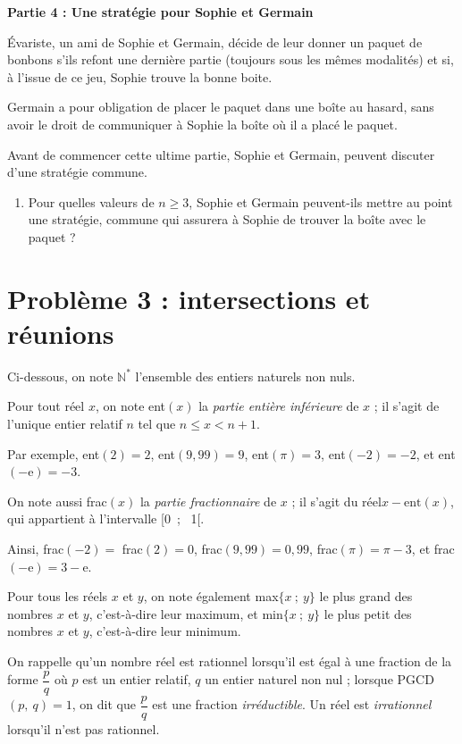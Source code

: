 \documentclass[landscape,twocolumn,leqno,a4paper,10pt]{report} %
\newcommand{\e}{\mathrm{e}}
\renewcommand{\textbf}[1]{\begingroup\bfseries\mathversion{bold}#1\endgroup}		%
\newcommand\N{\mathbb{N}}
\begin{document}
\bigskip
\begin{center}

\textbf{Partie 4 : Une stratégie pour Sophie et Germain}\end{center}

Évariste, un ami de Sophie et Germain, décide de leur donner un paquet de bonbons s'ils refont une dernière partie (toujours sous les mêmes modalités) et si, à l'issue de ce jeu, Sophie trouve la bonne boite.

Germain a pour obligation de placer le paquet dans une boîte au hasard, sans avoir le droit de communiquer à Sophie la boîte où il a placé le paquet.

Avant de commencer cette ultime partie, Sophie et Germain, peuvent discuter d'une stratégie commune.
\begin{enumerate}[resume]
\item Pour quelles valeurs de $n \geqslant 3$, Sophie et Germain peuvent-ils mettre au point une stratégie, commune qui assurera à Sophie de trouver la boîte avec le paquet ?
\end{enumerate}
\bigskip
\section{Problème 3 : intersections et réunions}

\smallskip

Ci-dessous, on note $\N^*$ l'ensemble des entiers naturels non nuls.

Pour tout réel $x$, on note ent$(x)$ la \emph{partie entière inférieure} de $x$ ; il s'agit de l'unique entier relatif $n$ tel que $n \leqslant  x < n + 1$.

Par exemple, ent$(2) = 2$, ent$(9,99) = 9$, ent$(\pi) = 3$, ent$(-2) = -2$, et ent$(- \e) = - 3$.

On note aussi frac$(x)$ la \emph{partie fractionnaire} de $x$ ; il s'agit du réel$ x - \text{ent}(x)$, qui appartient à l'intervalle [0~;~ 1[.

Ainsi, frac$(-2) =$ frac$(2) = 0$, frac$(9,99) = 0,99$, frac$(\pi) = \pi - 3$, et frac$(-\e) = 3 - \e$.

Pour tous les réels $x$ et $y$, on note également max$\{x~;~y\}$ le plus grand des nombres $x$ et $y$, c'est-à-dire leur maximum, et min$\{x~;~y\}$  le plus petit des nombres $x$ et $y$, c'est-à-dire leur minimum.

On rappelle qu'un nombre réel est rationnel lorsqu'il est égal à une fraction de la forme $\dfrac pq$ où $p$ est un entier relatif, $q$ un 
entier naturel non nul ; lorsque PGCD$(p,\:q) = 1$, on dit que $\dfrac pq$ est une fraction \emph{irréductible}. Un réel est \emph{irrationnel} lorsqu'il n'est pas rationnel.
\end{document}
